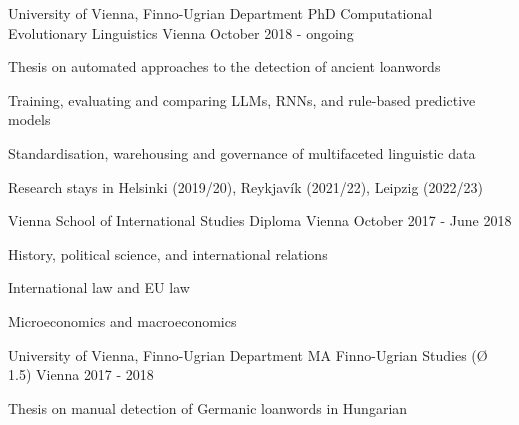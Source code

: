 

\begin{cventries}

  \cventry
    {University of Vienna, Finno-Ugrian Department} %
    {PhD Computational Evolutionary Linguistics} %
    {Vienna} %
    {October 2018 - ongoing} %
    {
      \begin{cvitems} %
        \item{Thesis on automated approaches to the detection of ancient loanwords}
        \item{Training, evaluating and comparing LLMs, RNNs, and rule-based predictive models}
        \item{Standardisation, warehousing and governance of multifaceted linguistic data}
        \item{Research stays in Helsinki (2019/20), Reykjavík (2021/22), Leipzig (2022/23)}
      \end{cvitems}
    }

  \cventry
    {Vienna School of International Studies} %
    {Diploma} %
    {Vienna} %
    {October 2017 - June 2018} %
    {
    \begin{cvitems} %
        \item{History, political science, and international relations}
        \item{International law and EU law}
        \item{Microeconomics and macroeconomics}
      \end{cvitems}
    }

  \cventry
    {University of Vienna, Finno-Ugrian Department} %
    {MA Finno-Ugrian Studies (Ø 1.5)} %
    {Vienna} %
    {2017 - 2018} %
    {
      \begin{cvitems} %
        \item {Thesis on manual detection of Germanic loanwords in Hungarian}
      \end{cvitems}
    }


\end{cventries}

